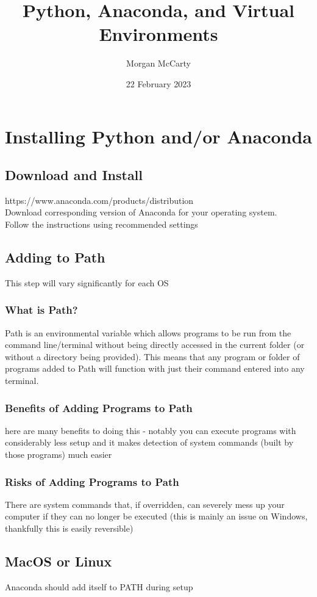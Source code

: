 \documentclass[12pt]{article}
\title{Python, Anaconda, and Virtual Environments}
\author{Morgan McCarty}
\date{22 February 2023}
\begin{document}
    \maketitle

    \section{Installing Python and/or Anaconda}
        \subsection{Download and Install}
            https://www.anaconda.com/products/distribution \\Download corresponding version of Anaconda for your operating system.
            \\Follow the instructions using recommended settings
        \subsection{Adding to Path}
            This step will vary significantly for each OS
            \subsubsection{What is Path?}
                Path is an environmental variable which allows programs to be run from the command line/terminal without being directly accessed in the current folder (or without a directory being provided).
                This means that any program or folder of programs added to Path will function with just their command entered into any terminal.
            \subsubsection{Benefits of Adding Programs to Path}
                here are many benefits to doing this - notably you can execute programs with considerably less setup and it makes detection of system commands
                (built by those programs) much easier
            \subsubsection{Risks of Adding Programs to Path}
                There are system commands that, if overridden, can severely mess up your computer if they can no longer be executed 
                (this is mainly an issue on Windows, thankfully this is easily reversible)
        \subsection{MacOS or Linux}
            Anaconda should add itself to PATH during setup
\end{document}
